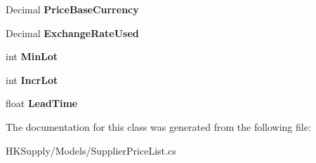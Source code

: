 \begin{DoxyCompactItemize}
Decimal {\bfseries Price\+Base\+Currency}
\item 
\mbox{\label{class_h_k_supply_1_1_models_1_1_supplier_price_list_a5b7bc437635f0d5e995364439186f242}} 
Decimal {\bfseries Exchange\+Rate\+Used}
\item 
\mbox{\label{class_h_k_supply_1_1_models_1_1_supplier_price_list_a1aee812b4e162e112e22e796694d5e05}} 
int {\bfseries Min\+Lot}
\item 
\mbox{\label{class_h_k_supply_1_1_models_1_1_supplier_price_list_a3628a269592844400371b58f83fa3266}} 
int {\bfseries Incr\+Lot}
\item 
\mbox{\label{class_h_k_supply_1_1_models_1_1_supplier_price_list_a70ee7a1580153a62146f076023380d61}} 
float {\bfseries Lead\+Time}
\end{DoxyCompactItemize}


The documentation for this class was generated from the following file\+:\begin{DoxyCompactItemize}
\item 
H\+K\+Supply/\+Models/Supplier\+Price\+List.\+cs\end{DoxyCompactItemize}
